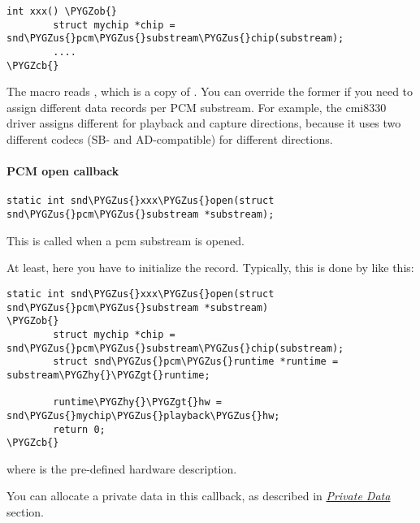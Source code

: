 \documentclass[a4paper,8pt,english]{sphinxmanual}
\def\PYGZus{\char`\_}
\def\PYGZob{\char`\{}
\def\PYGZcb{\char`\}}
\def\PYGZgt{\char`\>}
\def\PYGZhy{\char`\-}
\begin{document}
\begin{Verbatim}[commandchars=\\\{\}]
int xxx() \PYGZob{}
        struct mychip *chip = snd\PYGZus{}pcm\PYGZus{}substream\PYGZus{}chip(substream);
        ....
\PYGZcb{}
\end{Verbatim}

The macro reads , which is a copy of
. You can override the former if you need to
assign different data records per PCM substream. For example, the
cmi8330 driver assigns different  for playback and
capture directions, because it uses two different codecs (SB- and
AD-compatible) for different directions.


\paragraph{PCM open callback}
\label{sound/kernel-api/writing-an-alsa-driver:pcm-open-callback}
\begin{Verbatim}[commandchars=\\\{\}]
static int snd\PYGZus{}xxx\PYGZus{}open(struct snd\PYGZus{}pcm\PYGZus{}substream *substream);
\end{Verbatim}

This is called when a pcm substream is opened.

At least, here you have to initialize the 
record. Typically, this is done by like this:

\begin{Verbatim}[commandchars=\\\{\}]
static int snd\PYGZus{}xxx\PYGZus{}open(struct snd\PYGZus{}pcm\PYGZus{}substream *substream)
\PYGZob{}
        struct mychip *chip = snd\PYGZus{}pcm\PYGZus{}substream\PYGZus{}chip(substream);
        struct snd\PYGZus{}pcm\PYGZus{}runtime *runtime = substream\PYGZhy{}\PYGZgt{}runtime;

        runtime\PYGZhy{}\PYGZgt{}hw = snd\PYGZus{}mychip\PYGZus{}playback\PYGZus{}hw;
        return 0;
\PYGZcb{}
\end{Verbatim}

where  is the pre-defined hardware
description.

You can allocate a private data in this callback, as described in
{\hyperref[sound/kernel\string-api/writing\string-an\string-alsa\string-driver:private\string-data]{\emph{Private Data}}} section.
\end{document}
